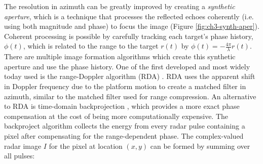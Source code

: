 
The resolution in azimuth can be greatly improved by creating a \emph{synthetic aperture}, which is a technique that processes the reflected echoes coherently (i.e. using both magnitude and phase) to focus the image (Figure \ref{fig:ch3-synth-aper}).
Coherent processing is possible by carefully tracking each target's phase history, $ \phi(t) $, which is related to the range to the target $r(t)$ by $\phi(t) = -\frac{4 \pi}{\lambda} r(t)$.
There are multiple image formation algorithms which create this synthetic aperture and use the phase history. One of the first developed and most widely today used is the range-Doppler algorithm (RDA) \citep{Wu1976DigitalSystemProduce, Cumming1979DigitalProcessingSeasat}. 
RDA uses the apparent shift in Doppler frequency due to the platform motion to create a matched filter in azimuth, similar to the matched filter used for range compression.
An alternative to RDA is time-domain backprojection \citep{Duersch2013BackprojectionSyntheticAperture}, which provides a more exact phase compensation at the cost of being more computationally expensive.
The backproject algorithm collects the energy from every radar pulse containing a pixel after compensating for the range-dependent phase.
The complex-valued radar image $I$ for the pixel at location $ (x, y) $ can be formed by summing over all pulses:
